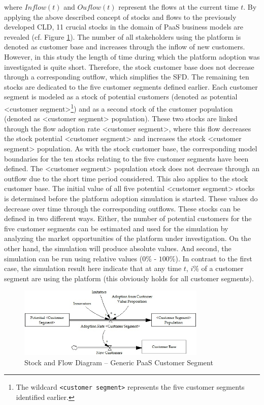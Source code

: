 where $Inflow(t)$ and $Ouflow(t)$ represent the flows at the current time $t$. By applying the above described concept of stocks and flows to the previously developed \ac{CLD}, 11 crucial stocks in the domain of \ac{PaaS} business models are revealed (cf. Figure \ref{fig:sfd_cs}). The number of all stakeholders using the platform is denoted as customer base and increases through the inflow of new customers. However, in this study the length of time during which the platform adoption was investigated is quite short. Therefore, the stock customer base does not decrease through a corresponding outflow, which simplifies the \ac{SFD}. The remaining ten stocks are dedicated to the five customer segments defined earlier. Each customer segment is modeled as a stock of potential customers (denoted as potential <customer segment>\footnote{The wildcard \texttt{<customer segment>} represents the five customer segments identified earlier.}) and as a second stock of the customer population (denoted as <customer segment> population). These two stocks are linked through the flow adoption rate <customer segment>, where this flow decreases the stock potential <customer segment> and increases the stock <customer segment> population. As with the stock customer base, the corresponding model boundaries for the ten stocks relating to the five customer segments have been defined. The <customer segment> population stock does not decrease through an outflow due to the short time period considered. This also applies to the stock customer base. The initial value of all five potential <customer segment> stocks is determined before the platform adoption simulation is started. These values do decrease over time through the corresponding outflows. These stocks can be defined in two different ways. Either, the number of potential customers for the five customer segments can be estimated and used for the simulation by analyzing the market opportunities of the platform under investigation. On the other hand, the simulation will produce absolute values. And second, the simulation can be run using relative values ($0\%$ - $100\%$). In contrast to the first case, the simulation result here indicate that at any time $t$, $i\%$ of a customer segment are using the platform (this obviously holds for all customer segments).

\begin{figure}[tb]
	\centering
	\includegraphics[width=0.8\textwidth]{gfx/sfd_customerSegment}
	\caption{Stock and Flow Diagram -- Generic PaaS Customer Segment}
	\label{fig:sfd_cs}
\end{figure}

